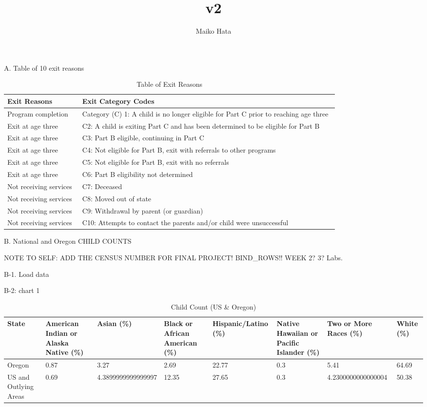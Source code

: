 \documentclass[
  letterpaper,
  DIV=11,
  numbers=noendperiod]{scrartcl}
\title{v2}
\author{Maiko Hata}
\date{}
\begin{document}
\maketitle


A. Table of 10 exit reasons

\begin{longtable}[l]{ll}
\caption{Table of Exit Reasons}\\
\toprule
Exit Reasons & Exit Category Codes\\
\midrule
Program completion & Category (C) 1: A child is no longer eligible for Part C prior to reaching age three \\
Exit at age three & C2: A child is exiting Part C and has been determined to be eligible for Part B \\
Exit at age three & C3: Part B eligible, continuing in Part C  \\
Exit at age three & C4: Not eligible for Part B, exit with referrals to other programs \\
Exit at age three & C5: Not eligible for Part B, exit with no referrals \\
\addlinespace
Exit at age three & C6: Part B eligibility not determined \\
Not receiving services  & C7: Deceased\\
Not receiving services  & C8: Moved out of state \\
Not receiving services  & C9: Withdrawal by parent (or guardian) \\
Not receiving services  & C10: Attempts to contact the parents and/or child were unsuccessful \\
\bottomrule
\end{longtable}

B. National and Oregon CHILD COUNTS

NOTE TO SELF: ADD THE CENSUS NUMBER FOR FINAL PROJECT! BIND\_ROWS!! WEEK
2? 3? Labs.

B-1. Load data

B-2: chart 1

\begin{longtable}[l]{llllllll}
\caption{Child Count (US & Oregon)}\\
\toprule
State & American Indian or Alaska Native (\%) & Asian (\%) & Black or African American (\%) & Hispanic/Latino (\%) & Native Hawaiian or Pacific Islander (\%) & Two or More Races (\%) & White (\%)\\
\midrule
Oregon & 0.87 & 3.27 & 2.69 & 22.77 & 0.3 & 5.41 & 64.69\\
US and Outlying Areas & 0.69 & 4.3899999999999997 & 12.35 & 27.65 & 0.3 & 4.2300000000000004 & 50.38\\
\bottomrule
\end{longtable}
\end{document}
